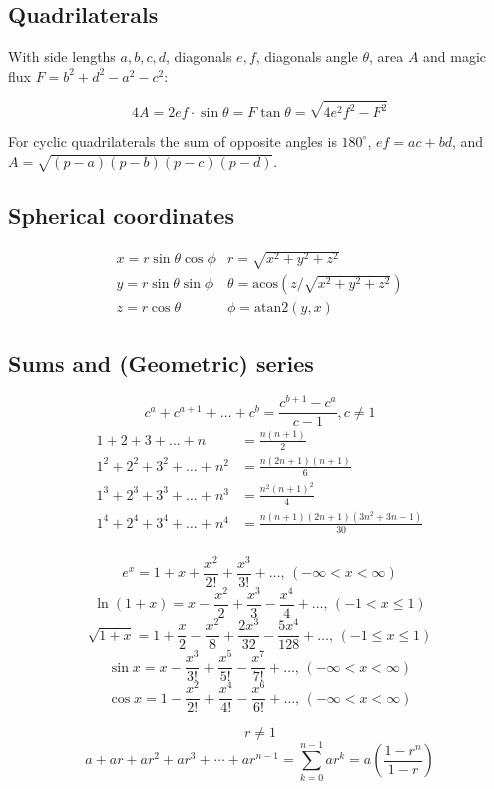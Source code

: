 \subsection{Quadrilaterals}
With side lengths $a,b,c,d$, diagonals $e, f$, diagonals angle $\theta$, area $A$ and
magic flux $F=b^2+d^2-a^2-c^2$:

\[ 4A = 2ef \cdot \sin\theta = F\tan\theta = \sqrt{4e^2f^2-F^2} \]

 For cyclic quadrilaterals the sum of opposite angles is $180^\circ$,
$ef = ac + bd$, and $A = \sqrt{(p-a)(p-b)(p-c)(p-d)}$.

\subsection{Spherical coordinates}
\[\begin{array}{cc}
x = r\sin\theta\cos\phi & r = \sqrt{x^2+y^2+z^2}\\
y = r\sin\theta\sin\phi & \theta = \textrm{acos}(z/\sqrt{x^2+y^2+z^2})\\
z = r\cos\theta & \phi = \textrm{atan2}(y,x)
\end{array}\]


\subsection{Sums and (Geometric) series}
\[ c^a + c^{a+1} + \dots + c^{b} = \frac{c^{b+1} - c^a}{c-1}, c \neq 1 \]
\begin{align*}
	1 + 2 + 3 + \dots + n &= \frac{n(n+1)}{2} \\
	1^2 + 2^2 + 3^2 + \dots + n^2 &= \frac{n(2n+1)(n+1)}{6} \\
	1^3 + 2^3 + 3^3 + \dots + n^3 &= \frac{n^2(n+1)^2}{4} \\
	1^4 + 2^4 + 3^4 + \dots + n^4 &= \frac{n(n+1)(2n+1)(3n^2 + 3n - 1)}{30} \\
\end{align*}

$$e^x = 1+x+\frac{x^2}{2!}+\frac{x^3}{3!}+\dots,\,(-\infty<x<\infty)$$
$$\ln(1+x) = x-\frac{x^2}{2}+\frac{x^3}{3}-\frac{x^4}{4}+\dots,\,(-1<x\leq1)$$
$$\sqrt{1+x} = 1+\frac{x}{2}-\frac{x^2}{8}+\frac{2x^3}{32}-\frac{5x^4}{128}+\dots,\,(-1\leq x\leq1)$$
$$\sin x = x-\frac{x^3}{3!}+\frac{x^5}{5!}-\frac{x^7}{7!}+\dots,\,(-\infty<x<\infty)$$
$$\cos x = 1-\frac{x^2}{2!}+\frac{x^4}{4!}-\frac{x^6}{6!}+\dots,\,(-\infty<x<\infty)$$

$$r \neq 1$$
$$a + ar + a r^2 + a r^3 + \cdots + a r^{n-1} = \sum_{k=0}^{n-1} ar^k= a \left(\frac{1-r^{n}}{1-r}\right)$$

